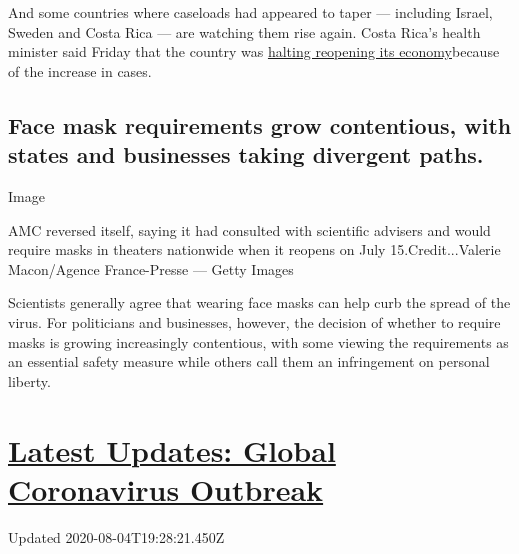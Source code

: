 And some countries where caseloads had appeared to taper --- including
Israel, Sweden and Costa Rica --- are watching them rise again. Costa
Rica's health minister said Friday that the country was
\href{https://www.reuters.com/article/us-health-coronavirus-costa-rica/costa-rica-halts-reopening-as-coronavirus-infections-keep-rising-idUSKBN23Q37L}{halting
reopening its economy}because of the increase in cases.

\hypertarget{face-mask-requirements-grow-contentious-with-states-and-businesses-taking-divergent-paths}{%
\subsection{Face mask requirements grow contentious, with states and
businesses taking divergent
paths.}\label{face-mask-requirements-grow-contentious-with-states-and-businesses-taking-divergent-paths}}

Image

AMC reversed itself, saying it had consulted with scientific advisers
and would require masks in theaters nationwide when it reopens on July
15.Credit...Valerie Macon/Agence France-Presse --- Getty Images

Scientists generally agree that wearing face masks can help curb the
spread of the virus. For politicians and businesses, however, the
decision of whether to require masks is growing increasingly
contentious, with some viewing the requirements as an essential safety
measure while others call them an infringement on personal liberty.

\hypertarget{latest-updates-global-coronavirus-outbreak}{%
\section{\texorpdfstring{\href{https://www.nytimes.com/2020/08/04/world/coronavirus-cases.html?action=click\&pgtype=Article\&state=default\&region=MAIN_CONTENT_1\&context=storylines_live_updates}{Latest
Updates: Global Coronavirus
Outbreak}}{Latest Updates: Global Coronavirus Outbreak}}\label{latest-updates-global-coronavirus-outbreak}}

Updated 2020-08-04T19:28:21.450Z

